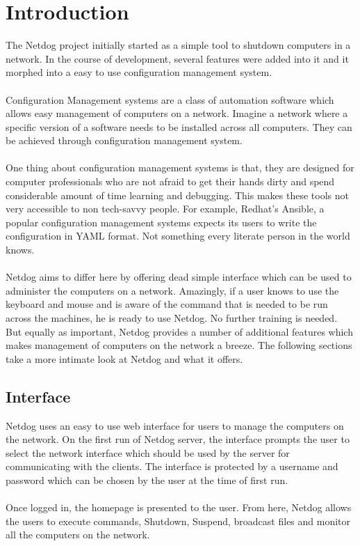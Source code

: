 \chapter{Introduction}

The Netdog project initially started as a simple tool to shutdown computers in a
network. In the course of development, several features were added into it and
it morphed into a easy to use configuration management system.
\\\\
Configuration Management systems are a class of automation software which allows
easy management of computers on a network. Imagine a network where a specific
version of a software needs to be installed across all computers. They can be
achieved through configuration management system.
\\\\
One thing about configuration management systems is that, they are designed for
computer professionals who are not afraid to get their hands dirty and spend
considerable amount of time learning and debugging. This makes these tools not
very accessible to non tech-savvy people. For example, Redhat's Ansible, a
popular configuration management systems expects its users to write the
configuration in YAML format. Not something every literate person in the world
knows.
\\\\
Netdog aims to differ here by offering dead simple interface which can be used
to administer the computers on a network. Amazingly, if a user knows to use the
keyboard and mouse and is aware of the command that is needed to be run across
the machines, he is ready to use Netdog. No further training is needed. But
equally as important, Netdog provides a number of additional features which
makes management of computers on the network a breeze. The following sections
take a more intimate look at Netdog and what it offers.

\section{Interface}

Netdog uses an easy to use web interface for users to manage the computers on
the network. On the first run of Netdog server, the interface prompts the user
to select the network interface which should be used by the server for
communicating with the clients. The interface is protected by a username and
password which can be chosen by the user at the time of first run.
\\\\
Once logged in, the homepage is presented to the user. From here, Netdog allows
the users to execute commands, Shutdown, Suspend, broadcast files and monitor
all the computers on the network.

